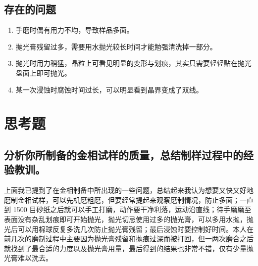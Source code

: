 \documentclass[a4paper,utf8]{article}
\begin{document}
    \subsection{存在的问题}
        \begin{enumerate}
            \item 手磨时偶有用力不均，导致样品多面。
            \item 抛光膏残留过多，需要用水抛光较长时间才能勉强清洗掉一部分。
            \item 抛光时用力稍猛，晶粒上可看见明显的变形与划痕，其实只需要轻轻贴在抛光盘面上即可抛光。
            \item 某一次浸蚀时腐蚀时间过长，可以明显看到晶界变成了双线。
        \end{enumerate}
\section{思考题}
    \subsection{分析你所制备的金相试样的质量，总结制样过程中的经验教训。}
        上面我已提到了在金相制备中所出现的一些问题，总结起来我认为想要又快又好地磨制金相试样，可以先机磨粗磨，但要经常提起来观察磨制情况，防止多面；一直到 1500 目砂纸之后就可以手工打磨，动作要干净利落，运动沿直线；待手磨磨至表面没有杂乱划痕即可开始抛光，抛光切忌使用过多的抛光膏，可以多用水抛，抛光后可以用棉球反复多洗几次防止抛光膏残留；最后浸蚀时要控制好时间。本人在前几次的磨制过程中主要因为抛光膏残留和抛痕过深而被打回，但一两次磨合之后就找到了最合适的力度以及抛光膏用量，最后得到的结果也非常不错，仅有少量抛光膏难以洗去。
\end{document}
